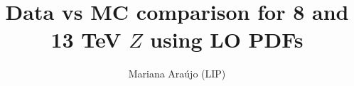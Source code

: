 \documentclass{article}
\begin{document}
\title{Data vs MC comparison for 8 and 13 TeV $Z$ using LO PDFs}
\author{Mariana Ara\'ujo (LIP)}
\maketitle

\clearpage

\end{document}
